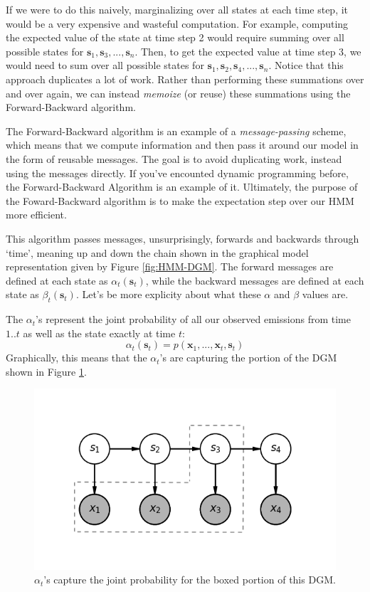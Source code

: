 If we were to do this naively, marginalizing over all states at each time step, it would be a very expensive and wasteful computation. For example, computing the expected value of the state at time step 2 would require summing over all possible states for $\textbf{s}_1, \textbf{s}_3, ..., \textbf{s}_n$. Then, to get the expected value at time step 3, we would need to sum over all possible states for $\textbf{s}_1, \textbf{s}_2, \textbf{s}_4, ..., \textbf{s}_n$. Notice that this approach duplicates a lot of work. Rather than performing these summations over and over again, we can instead \textit{memoize} (or reuse) these summations using the Forward-Backward algorithm.

The Forward-Backward algorithm is an example of a \textit{message-passing} scheme, which means that we compute information and then pass it around our model in the form of reusable messages. The goal is to avoid duplicating work, instead using the messages directly. If you've encounted dynamic programming before, the Forward-Backward Algorithm is an example of it. Ultimately, the purpose of the Foward-Backward algorithm is to make the expectation step over our HMM more efficient.

This algorithm passes messages, unsurprisingly, forwards and backwards through `time', meaning up and down the chain shown in the graphical model representation given by Figure \ref{fig:HMM-DGM}. The forward messages are defined at each state as $\alpha_t(\textbf{s}_t)$, while the backward messages are defined at each state as $\beta_t(\textbf{s}_t)$. Let's be more explicity about what these $\alpha$ and $\beta$ values are.

The $\alpha_t$'s represent the joint probability of all our observed emissions from time $1..t$ as well as the state exactly at time $t$:
\begin{equation} \label{unfactorized-alphas}
	\alpha_t(\textbf{s}_t) = p(\textbf{x}_1, ..., \textbf{x}_t, \textbf{s}_t)
\end{equation}
Graphically, this means that the $\alpha_t$'s are capturing the portion of the DGM shown in Figure \ref{fig:HMM-DGM-alpha}.
\begin{figure}
    \centering
    \includegraphics[width=0.5\paperwidth]{../HiddenMarkovModels/fig/HMM_DGM_alpha.png}
    \caption{$\alpha_t$'s capture the joint probability for the boxed portion of this DGM.}
    \label{fig:HMM-DGM-alpha}
\end{figure}

